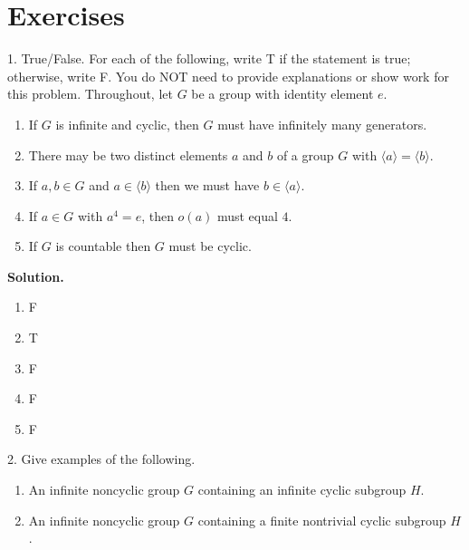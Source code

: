 \documentclass[10pt,]{book}
\theoremstyle{plain}
\theoremstyle{definition}
\theoremstyle{definition}
\theoremstyle{definition}
\theoremstyle{definition}
\numberwithin{equation}{section}
\begin{document}
\section[{Exercises}]{Exercises}\label{exercises-6}
\begin{exerciselist}
\item[1.]\hypertarget{exercise-34}{}True/False. For each of the following, write T if the statement is true; otherwise, write F. You do NOT need to provide explanations or show work for this problem. Throughout, let \(G\) be a group with identity element \(e\). \leavevmode%
\begin{enumerate}[label=(\alph*)]
\item\hypertarget{li-266}{}If \(G\) is infinite and cyclic, then \(G\) must have infinitely many generators.%
\item\hypertarget{li-267}{}There may be two distinct elements \(a\) and \(b\) of a group \(G\) with \(\langle a\rangle =\langle b\rangle\).%
\item\hypertarget{li-268}{}If \(a,b\in G\) and \(a\in \langle b\rangle\) then we must have \(b\in \langle a\rangle\).%
\item\hypertarget{li-269}{}If \(a\in G\) with \(a^4=e\), then \(o(a)\) must equal \(4\).%
\item\hypertarget{li-270}{}If \(G\) is countable then \(G\) must be cyclic.%
\end{enumerate}
%
\par\smallskip
\par\smallskip
\noindent\textbf{Solution.}\hypertarget{solution-34}{}\quad
\leavevmode%
\begin{multicols}{5}
\begin{enumerate}[label=(\alph*)]
\item\hypertarget{li-271}{}F%
\item\hypertarget{li-272}{}T%
\item\hypertarget{li-273}{}F%
\item\hypertarget{li-274}{}F%
\item\hypertarget{li-275}{}F%
\end{enumerate}
\end{multicols}
\item[2.]\hypertarget{exercise-35}{}Give examples of the following. \leavevmode%
\begin{enumerate}[label=(\alph*)]
\item\hypertarget{li-276}{}An infinite noncyclic group \(G\) containing an infinite cyclic subgroup \(H\).%
\item\hypertarget{li-277}{}An infinite noncyclic group \(G\) containing a finite nontrivial cyclic subgroup \(H\).%

\end{enumerate}
\end{exerciselist}
\end{document}
